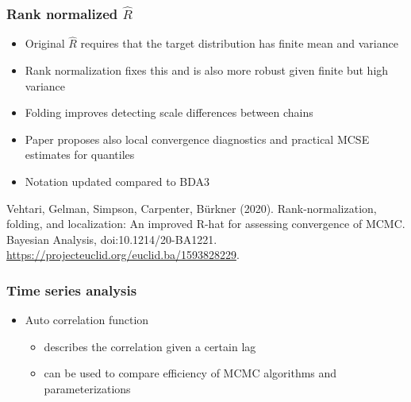 \documentclass[10pt,handout]{beamer}
\begin{document}
\begin{frame}[fragile]

\frametitle{ Rank normalized $\widehat{R}$}

  \begin{itemize}
  \item<+-> Original $\widehat{R}$ requires that the target distribution
    has finite mean and variance
  \item<+-> Rank normalization fixes this and is also more robust given
    finite but high variance
  \item<+-> Folding improves detecting scale differences between chains
  \item<+-> Paper proposes also local convergence diagnostics and
    practical MCSE estimates for quantiles
  \item<+-> Notation updated compared to BDA3
  \end{itemize}

    Vehtari, Gelman, Simpson, Carpenter, Bürkner
  (2020). Rank-normalization, folding, and localization: An improved
  R-hat for assessing convergence of MCMC. Bayesian Analysis, doi:10.1214/20-BA1221. \url{https://projecteuclid.org/euclid.ba/1593828229}.

\end{frame}

\begin{frame}

\frametitle{ Time series analysis}

  \begin{itemize}
  \item Auto correlation function
    \begin{itemize}
    \item describes the correlation given a certain lag
    \item can be used to compare efficiency of MCMC algorithms and parameterizations
    \end{itemize}
  \end{itemize}
\end{frame}
\end{document}
